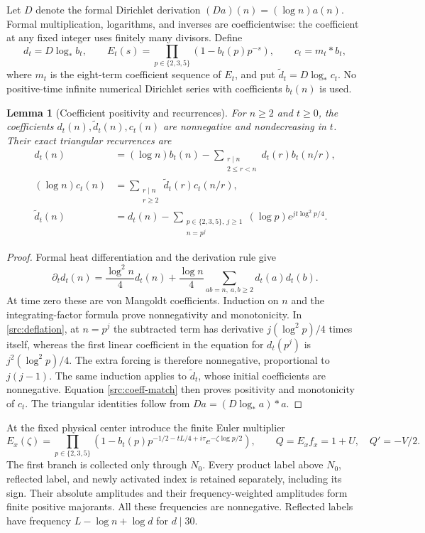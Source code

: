 \documentclass[11pt,a4paper]{article}
\newtheorem{lemma}[theorem]{Lemma}
\theoremstyle{definition}
\theoremstyle{remark}
\begin{document}
Let $D$ denote the formal Dirichlet derivation $(Da)(n)=(\log n)a(n)$.
Formal multiplication, logarithms, and inverses are coefficientwise:
the coefficient at any fixed integer uses finitely many divisors.  Define
\[
 d_t=D\log_*b_t,\qquad
 E_t(s)=\prod_{p\in\{2,3,5\}}(1-b_t(p)p^{-s}),
 \qquad c_t=m_t*b_t,
\]
where $m_t$ is the eight-term coefficient sequence of $E_t$, and put
$\widetilde d_t=D\log_*c_t$.  No positive-time infinite numerical
Dirichlet series with coefficients $b_t(n)$ is used.

\begin{lemma}[Coefficient positivity and recurrences]\label{src:coeff}
For $n\geq2$ and $t\geq0$, the coefficients
$d_t(n),\widetilde d_t(n),c_t(n)$ are nonnegative and nondecreasing in
$t$.  Their exact triangular recurrences are
\begin{align}
 d_t(n)&=(\log n)b_t(n)
       -\sum_{\substack{r\mid n\\2\leq r<n}}d_t(r)b_t(n/r),
       \label{src:triangular}\\
 (\log n)c_t(n)&=\sum_{\substack{r\mid n\\r\geq2}}
                         \widetilde d_t(r)c_t(n/r),\label{src:coeff-match}\\
 \widetilde d_t(n)&=d_t(n)
 -\sum_{\substack{p\in\{2,3,5\},\ j\geq1\\n=p^j}}
           (\log p)e^{jt\log^2p/4}.
 \label{src:deflation}
\end{align}
\end{lemma}
\begin{proof}
Formal heat differentiation and the derivation rule give
\[
 \partial_t d_t(n)=\frac{\log^2n}{4}d_t(n)
 +\frac{\log n}{4}\sum_{ab=n,\ a,b\geq2}d_t(a)d_t(b).
\]
At time zero these are von Mangoldt coefficients.  Induction on $n$
and the integrating-factor formula prove nonnegativity and
monotonicity.  In \eqref{src:deflation}, at $n=p^j$ the subtracted term
has derivative $j(\log^2p)/4$ times itself, whereas the first linear
coefficient in the equation for $d_t(p^j)$ is
$j^2(\log^2p)/4$.  The extra forcing is therefore nonnegative,
proportional to $j(j-1)$.  The same induction applies to
$\widetilde d_t$, whose initial coefficients are nonnegative.
Equation \eqref{src:coeff-match} then proves positivity and monotonicity
of $c_t$.  The triangular identities follow from
$Da=(D\log_*a)*a$.
\end{proof}

At the fixed physical center introduce the finite Euler multiplier
\[
 E_x(\zeta)=\prod_{p\in\{2,3,5\}}
 \left(1-b_t(p)p^{-1/2-tL/4+i\tau}e^{-\zeta\log p/2}\right),
 \qquad Q=E_xf_x=1+U,\quad Q'=-V/2.
\]
The first branch is collected only through $N_0$.  Every product label
above $N_0$, reflected label, and newly activated index is retained
separately, including its sign.  Their absolute amplitudes and their
frequency-weighted amplitudes form finite positive majorants.
All these frequencies are nonnegative.  Reflected labels have frequency
$L-\log n+\log d$ for $d\mid30$.
\end{document}
